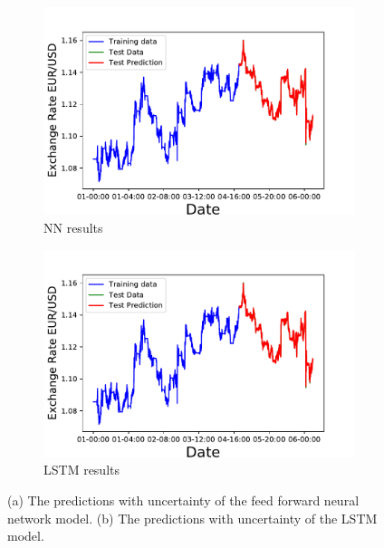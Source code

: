 \documentclass[10pt,a4paper]{article}
\begin{document}
\begin{figure}[h]
\centering
\begin{subfigure}{.5\textwidth}
  \centering
  \includegraphics[scale=0.41]{EURO_USD_exchange_rate_NN.pdf}
  \caption{NN results}
  \label{fig:NN results EURO_USD}
\end{subfigure}%
\begin{subfigure}{.5\textwidth}
  \centering
  \includegraphics[scale=0.41]{EURO_USD_exchange_rate_LSTN.pdf}
  \caption{LSTM results}
  \label{fig:LSTM results EURO_USD}
\end{subfigure}
\caption{(a) The predictions with uncertainty of the feed forward neural network model. (b) The predictions with uncertainty of the LSTM model.}
\label{fig:results EURO_USD}
\end{figure}
\end{document}
